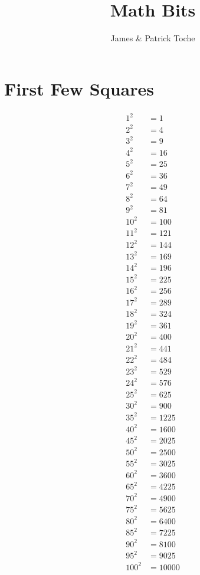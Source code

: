 \documentclass[12pt]{article}
\title{Math Bits}
\author{James \& Patrick Toche}
\begin{document}
\maketitle

\newpage
\section*{First Few Squares}
\begin{align*}
1^2   & = 1\\ 
2^2   & = 4\\ 
3^2   & = 9\\ 
4^2   & = 16\\ 
5^2   & = 25\\ 
6^2   & = 36\\ 
7^2   & = 49\\
8^2   & = 64\\ 
9^2   & = 81\\ 
10^2  & = 100\\
11^2  & = 121\\
12^2  & = 144\\
13^2  & = 169\\
14^2  & = 196\\
15^2  & = 225\\
16^2  & = 256\\
17^2  & = 289\\
18^2  & = 324\\
19^2  & = 361\\
20^2  & = 400\\
21^2  & = 441\\
22^2  & = 484\\
23^2  & = 529\\
24^2  & = 576\\
25^2  & = 625\\
30^2  & = 900\\
35^2  & = 1225\\
40^2  & = 1600\\
45^2  & = 2025\\
50^2  & = 2500\\
55^2  & = 3025\\
60^2  & = 3600 \\
65^2  & = 4225\\
70^2  & = 4900\\
75^2  & = 5625\\
80^2  & = 6400\\
85^2  & = 7225\\
90^2  & = 8100\\
95^2  & = 9025\\
100^2 & = 10000
\end{align*}
\end{document}
